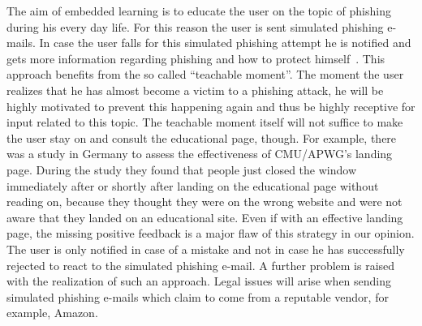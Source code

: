 \begin{description}[leftmargin=0cm]
	\item[Emdedded Learning] The aim of embedded learning is to educate the user on the topic of phishing during his every day life.
 For this reason the user is sent simulated phishing e-mails.
 In case the user falls for this simulated phishing attempt he is notified and gets more information regarding phishing and how to protect himself~\cite{embedded2011jansson, kumaraguru2009phishguru}. 
This approach benefits from the so called ``teachable moment''. 
The moment the user realizes that he has almost become a victim to a phishing attack, he will be highly motivated to prevent this happening again and thus be highly receptive for input related to this topic.
 The teachable moment itself will not suffice to make the user stay on and consult the educational page, though.
 For example, there was a study in Germany to assess the effectiveness of CMU/APWG's landing page. 
 During the study they found that people just closed the window immediately after or shortly after landing on the educational page without reading on,  because they thought they were on the wrong website and were not aware that they landed on an educational site.
 Even if with an effective landing page, the missing positive feedback is a major flaw of this strategy in our opinion.
 The user is only notified in case of a mistake and not in case he has successfully rejected to react to the simulated phishing e-mail.
 A further problem is raised with the realization of such an approach.
 Legal issues will arise when sending simulated phishing e-mails which claim to come from a reputable vendor, for example, Amazon.

\end{description}


